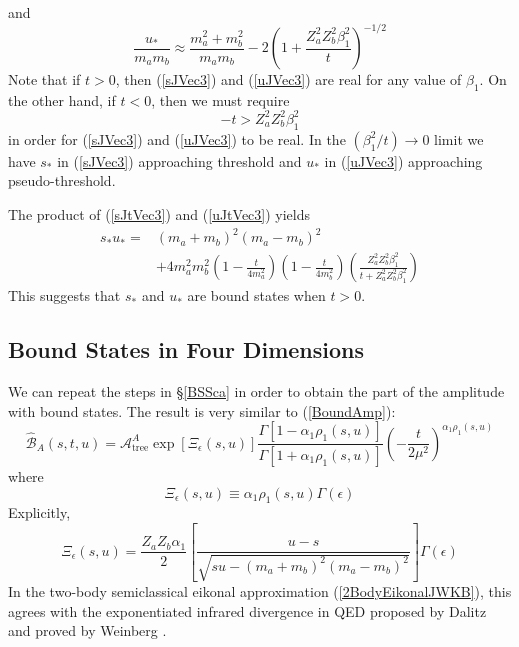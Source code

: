 and
\begin{equation}
	\frac{u_{*}}{m_{a} m_{b}} \approx \frac{m_{a}^{2} + m_{b}^{2}}{m_{a} m_{b}} - 2 \left(1 + \frac{Z_{a}^{2} Z_{b}^{2} \beta_{1}^{2}}{t} \right)^{-1/2} \label{uJVec3}
\end{equation}
Note that if $t > 0$, then (\ref{sJVec3}) and (\ref{uJVec3}) are real for any value of $\beta_{1}$. On the other hand, if $t < 0$, then we must require
\begin{equation}
	{-t} > Z_{a}^{2} Z_{b}^{2} \beta_{1}^{2}
\end{equation}
in order for (\ref{sJVec3}) and (\ref{uJVec3}) to be real. In the $(\beta_{1}^{2} / t) \rightarrow 0$ limit we have $s_{*}$ in (\ref{sJVec3}) approaching threshold and $u_{*}$ in (\ref{uJVec3}) approaching pseudo-threshold.

The product of (\ref{sJtVec3}) and (\ref{uJtVec3}) yields
\begin{equation}
\begin{split}
	s_{*} u_{*} = {}& (m_{a} + m_{b})^{2} (m_{a} - m_{b})^{2} \\
	&+ 4 m_{a}^{2} m_{b}^{2} \left(1 - \frac{t}{4m_{a}^{2}} \right) \left(1 - \frac{t}{4m_{b}^{2}} \right) \left(\frac{Z_{a}^{2} Z_{b}^{2} \beta_{1}^{2}}{t + Z_{a}^{2} Z_{b}^{2} \beta_{1}^{2}} \right)
\end{split}
\end{equation}
This suggests that $s_{*}$ and $u_{*}$ are bound states when $t > 0$.
\subsection{Bound States in Four Dimensions\label{BSVec}}
We can repeat the steps in \S\ref{BSSca} in order to obtain the part of the amplitude with bound states. The result is very similar to (\ref{BoundAmp}):
\begin{equation}
	\widehat{\mathcal{B}}_{A}(s, t, u) = \mathcal{A}_{\text{tree}}^{A} \exp{[ \Xi_{\epsilon}(s, u)]} \frac{\Gamma[1 - \alpha_{1} \rho_{1}(s, u)]}{\Gamma[1 + \alpha_{1} \rho_{1}(s, u)]} \left( -\frac{t}{2 \mu^{2}} \right)^{\alpha_{1} \rho_{1}(s, u)} \label{BoundAmpVec}
\end{equation}
where
\begin{equation}
	\Xi_{\epsilon}(s, u) \equiv \alpha_{1} \rho_{1}(s, u) \Gamma(\epsilon)
\end{equation}
Explicitly,
\begin{equation}
	\Xi_{\epsilon}(s, u) = \frac{Z_{a} Z_{b} \alpha_{1}}{2} \left[ \frac{u - s}{\sqrt{s u - (m_{a} + m_{b})^{2}(m_{a} - m_{b})^{2}}} \right] \Gamma(\epsilon)
\end{equation}
In the two-body semiclassical eikonal approximation (\ref{2BodyEikonalJWKB}), this agrees with the exponentiated infrared divergence in QED proposed by Dalitz \cite{Dalitz:1951ah} and proved by Weinberg \cite{Weinberg:1965nx}.
